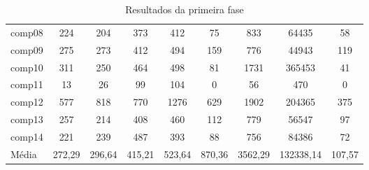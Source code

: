 \documentclass[11pt]{article}
\begin{document}
\begin{table}[htbf]
\begin{center}
\begin{footnotesize}
\begin{tabular}{|l|c|c|c|c|c|c|c||c|}
comp08&224&204&373&412&75&833&64435&58\\
comp09&275&273&412&494&159&776&44943&119\\
comp10&311&250&464&498&81&1731&365453&41\\
comp11&13&26&99&104&0&56&470&0\\
comp12&577&818&770&1276&629&1902&204365&375\\
comp13&257&214&408&460&112&779&56547&97\\
comp14&221&239&487&393&88&756&84386&72\\ \hline
Média&272,29&296,64&415,21&523,64&870,36&3562,29&132338,14&107,57\\ \hline
\end{tabular}
\end{footnotesize}
\caption{Resultados da primeira fase}
\label{tab:solucoes_itc2007_1}
\end{center}
\end{table}



\end{document}
